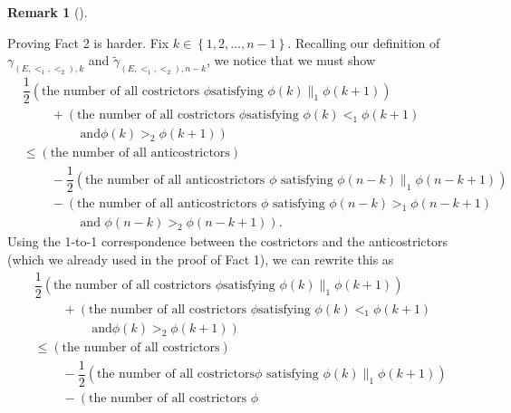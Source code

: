 \documentclass[numbers=enddot,12pt,final,onecolumn,notitlepage,abstracton]{scrartcl}
\theoremstyle{definition}
\newtheorem{remk}[theo]{Remark}
\newenvironment{remark}[1][]
{\begin{remk}[#1]\begin{leftbar}}
{\end{leftbar}\end{remk}}
\newenvironment{verlong}{}{}
\begin{document}
\begin{remark}
\begin{verlong}
Proving Fact 2 is harder. Fix $k\in\left\{  1,2,\ldots,n-1\right\}  $.
Recalling our definition of $\gamma_{\left(  E,<_{1},<_{2}\right)  ,k}$ and
$\widetilde{\gamma}_{\left(  E,<_{1},<_{2}\right)  ,n-k}$, we notice that we
must show%
\begin{align*}
& \dfrac{1}{2}\left(  \text{the number of all costrictors }\phi\text{
satisfying }\phi\left(  k\right)  \parallel_{1}\phi\left(  k+1\right)
\right)  \\
& \ \ \ \ \ \ \ \ \ \ +\left(  \text{the number of all costrictors }\phi\text{
satisfying }\phi\left(  k\right)  <_{1}\phi\left(  k+1\right)  \right. \\
& \ \ \ \ \ \ \ \ \ \ \qquad \left. \text{ and
}\phi\left(  k\right)  >_{2}\phi\left(  k+1\right)  \right)  \\
& \leq\left(  \text{the number of all anticostrictors}\right)  \\
& \ \ \ \ \ \ \ \ \ \ -\dfrac{1}{2}\left(  \text{the number of all
anticostrictors }\phi\text{ satisfying }\phi\left(  n-k\right)  \parallel
_{1}\phi\left(  n-k+1\right)  \right)  \\
& \ \ \ \ \ \ \ \ \ \ -\left(  \text{the number of all anticostrictors }%
\phi\text{ satisfying }\phi\left(  n-k\right)  >_{1}\phi\left(  n-k+1\right)
\right. \\
& \ \ \ \ \ \ \ \ \ \ \qquad \left.
\text{ and }\phi\left(  n-k\right)  >_{2}\phi\left(  n-k+1\right)  \right)  .
\end{align*}
Using the 1-to-1 correspondence between the costrictors and the
anticostrictors (which we already used in the proof of Fact 1), we can rewrite
this as%
\begin{align*}
& \dfrac{1}{2}\left(  \text{the number of all costrictors }\phi\text{
satisfying }\phi\left(  k\right)  \parallel_{1}\phi\left(  k+1\right)
\right)  \\
& \ \ \ \ \ \ \ \ \ \ +\left(  \text{the number of all costrictors }\phi\text{
satisfying }\phi\left(  k\right)  <_{1}\phi\left(  k+1\right) \right. \\
& \ \ \ \ \ \ \ \ \ \ \qquad \left. \text{ and
}\phi\left(  k\right)  >_{2}\phi\left(  k+1\right)  \right)  \\
& \leq\left(  \text{the number of all costrictors}\right)  \\
& \ \ \ \ \ \ \ \ \ \ -\dfrac{1}{2}\left(  \text{the number of all costrictors
}\phi\text{ satisfying }\phi\left(  k\right)  \parallel_{1}\phi\left(
k+1\right)  \right)  \\
& \ \ \ \ \ \ \ \ \ \ -\left(  \text{the number of all costrictors }\phi\text{
}
\end{align*}
\end{verlong}
\end{remark}
\end{document}
